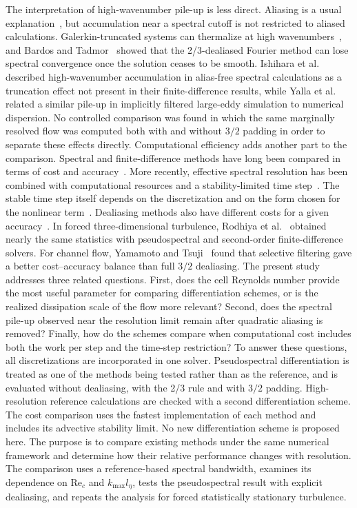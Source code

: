 \documentclass[11pt,a4paper]{article}
\newcommand{\Rey}{\mathrm{Re}}
\begin{document}
The interpretation of high-wavenumber pile-up is less direct. Aliasing is a usual explanation~\cite{fontana2020}, but accumulation near a spectral cutoff is not restricted to aliased calculations. Galerkin-truncated systems can thermalize at high wavenumbers~\cite{cichowlas2005,frisch2008,ray2011}, and Bardos and Tadmor~\cite{bardos2015} showed that the 2/3-dealiased Fourier method can lose spectral convergence once the solution ceases to be smooth. Ishihara et al.~\cite{ishihara2018} described high-wavenumber accumulation in alias-free spectral calculations as a truncation effect not present in their finite-difference results, while Yalla et al.~\cite{yalla2021} related a similar pile-up in implicitly filtered large-eddy simulation to numerical dispersion. No controlled comparison was found in which the same marginally resolved flow was computed both with and without $3/2$ padding in order to separate these effects directly.
Computational efficiency adds another part to the comparison. Spectral and finite-difference methods have long been compared in terms of cost and accuracy~\cite{fornberg1987}. More recently, effective spectral resolution has been combined with computational resources and a stability-limited time step~\cite{kawai2026}. The stable time step itself depends on the discretization and on the form chosen for the nonlinear term~\cite{raeth2024}. Dealiasing methods also have different costs for a given accuracy~\cite{sinhababu2021,lambert2026}. In forced three-dimensional turbulence, Rodhiya et al.~\cite{rodhiya2026} obtained nearly the same statistics with pseudospectral and second-order finite-difference solvers. For channel flow, Yamamoto and Tsuji~\cite{yamamoto2026} found that selective filtering gave a better cost--accuracy balance than full $3/2$ dealiasing.
The present study addresses three related questions. First, does the cell Reynolds number provide the most useful parameter for comparing differentiation schemes, or is the realized dissipation scale of the flow more relevant? Second, does the spectral pile-up observed near the resolution limit remain after quadratic aliasing is removed? Finally, how do the schemes compare when computational cost includes both the work per step and the time-step restriction?
To answer these questions, all discretizations are incorporated in one solver. Pseudospectral differentiation is treated as one of the methods being tested rather than as the reference, and is evaluated without dealiasing, with the 2/3 rule and with $3/2$ padding. High-resolution reference calculations are checked with a second differentiation scheme. The cost comparison uses the fastest implementation of each method and includes its advective stability limit.
No new differentiation scheme is proposed here. The purpose is to compare existing methods under the same numerical framework and determine how their relative performance changes with resolution. The comparison uses a reference-based spectral bandwidth, examines its dependence on $\Rey_c$ and $k_{\max}l_\eta$, tests the pseudospectral result with explicit dealiasing, and repeats the analysis for forced statistically stationary turbulence.
\end{document}
